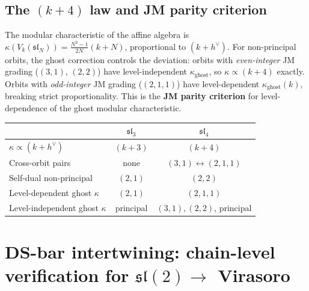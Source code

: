 \documentclass[11pt]{article}
\newcommand{\fsl}{\mathfrak{sl}}
\begin{document}
\subsection{The $(k+4)$ law and JM parity criterion}
\label{subsec:sl4-kN-law-wn}

\begin{observation}
\label{obs:sl4-kN-law-wn}
The modular characteristic of the affine algebra is
$\kappa(V_k(\fsl_N)) = \frac{N^2-1}{2N}(k+N)$, proportional to $(k+h^\vee)$.
For non-principal orbits, the ghost correction controls the deviation:
orbits with \emph{even-integer} JM grading ($(3,1)$, $(2,2)$) have
level-independent $\kappa_{\mathrm{ghost}}$, so $\kappa \propto (k+4)$
exactly.  Orbits with \emph{odd-integer} JM grading ($(2,1,1)$) have
level-dependent $\kappa_{\mathrm{ghost}}(k)$, breaking strict
proportionality.  This is the \textbf{JM parity criterion} for
level-dependence of the ghost modular characteristic.
\end{observation}

\begin{observation}[Comparison with $\fsl_3$]
\label{obs:sl4-vs-sl3-wn}
\begin{center}
\renewcommand{\arraystretch}{1.2}
\begin{tabular}{lcc}
& $\fsl_3$ & $\fsl_4$ \\
\hline
$\kappa \propto (k+h^\vee)$ & $(k+3)$ & $(k+4)$ \\[2pt]
Cross-orbit pairs & none & $(3,1) \leftrightarrow (2,1,1)$ \\[2pt]
Self-dual non-principal & $(2,1)$ & $(2,2)$ \\[2pt]
Level-dependent ghost $\kappa$ & $(2,1)$ & $(2,1,1)$ \\[2pt]
Level-independent ghost $\kappa$ & principal & $(3,1), (2,2)$, principal \\[2pt]
\end{tabular}
\end{center}
\end{observation}




%
%

\section{DS-bar intertwining: chain-level verification for
$\fsl(2) \to$ Virasoro}
\label{sec:ds-bar-chain-level}
\end{document}
